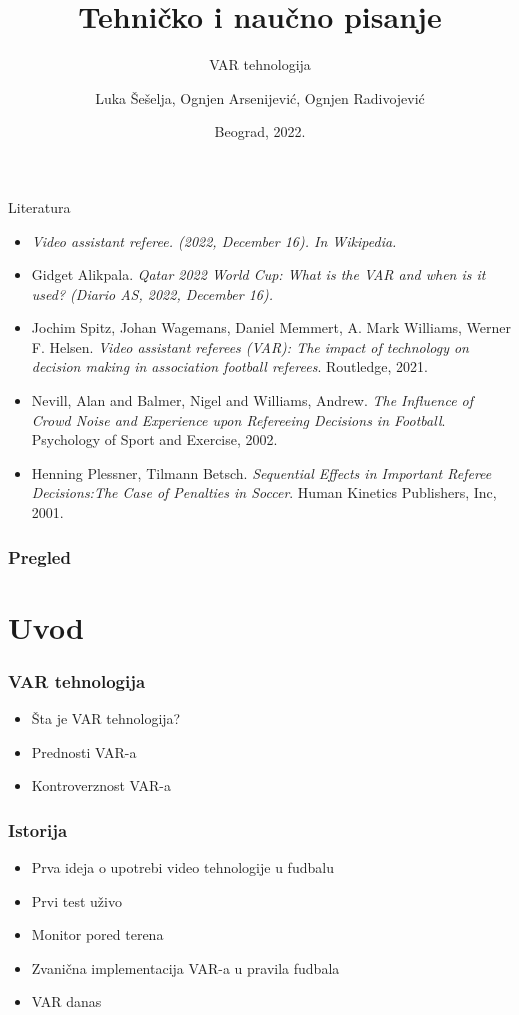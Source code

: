 \documentclass{beamer}
\title{Tehničko i naučno pisanje}
\subtitle{VAR tehnologija}
\author{Luka Šešelja, Ognjen Arsenijević, Ognjen Radivojević}
\institute{Matematički fakultet\\Univerzitet u Beogradu}
\date{\footnotesize{Beograd, 2022.}}
\begin{document}
\begin{frame}
\titlepage
\end{frame}

\begin{frame}[fragile]{Literatura}
    \begin{itemize}
        \item \em{Video assistant referee}. (2022, December 16). In Wikipedia. 
        \item Gidget Alikpala. \em{Qatar 2022 World Cup: What is the VAR and when is it used?} (Diario AS, 2022, December 16).
        \item Jochim Spitz, Johan Wagemans, Daniel Memmert, A. Mark Williams, Werner F. Helsen. \emph{Video assistant referees (VAR): The impact of technology on decision making in association football referees}. Routledge, 2021. 
        \item  Nevill, Alan and Balmer, Nigel and Williams, Andrew. \emph{The Influence of Crowd Noise and Experience upon Refereeing Decisions in Football}. Psychology of Sport and Exercise, 2002.
        \item Henning Plessner, Tilmann Betsch. \emph{Sequential Effects in Important Referee Decisions:The Case of Penalties in Soccer}. Human Kinetics Publishers, Inc, 2001.
    \end{itemize}
\end{frame}

\begin{frame}
  \frametitle{Pregled}
  \tableofcontents
\end{frame}

\section{Uvod}

\begin{frame}
  \frametitle{VAR tehnologija}
  \begin{itemize}
    \item Šta je VAR tehnologija?
    \item Prednosti VAR-a
    \item Kontroverznost VAR-a
  \end{itemize}
\end{frame}

\begin{frame}
  \frametitle{Istorija}
  \begin{itemize}
    \item Prva ideja o upotrebi video tehnologije u fudbalu
    \item Prvi test uživo
    \item Monitor pored terena
    \item Zvanična implementacija VAR-a u pravila fudbala
    \item VAR danas
  \end{itemize}
\end{frame}
\end{document}
